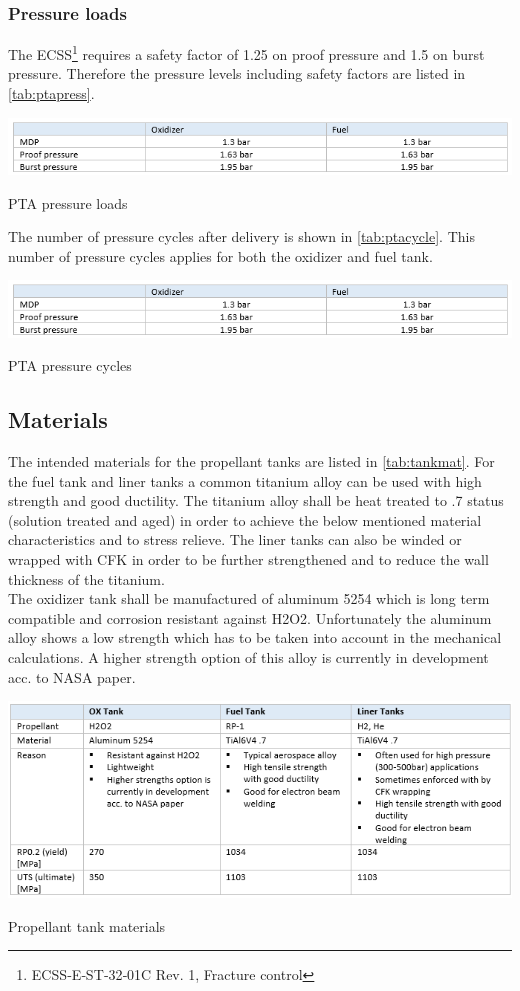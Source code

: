 \subsubsection{Pressure loads}
The ECSS\footnote{ECSS‐E‐ST‐32‐01C Rev. 1, Fracture control} requires a safety factor of 1.25 on proof pressure and 1.5 on burst pressure. Therefore the pressure levels including safety factors are listed in \autoref{tab:ptapress}.
\begin{table}[H]
	\centering
	\includegraphics[width = \linewidth]{ptapress}
	\caption{PTA pressure loads}
	\label{tab:ptapress}
\end{table}{}
The number of pressure cycles after delivery is shown in \autoref{tab:ptacycle}. This number of pressure cycles applies for both the oxidizer and fuel tank.
\begin{table}[H]
	\centering
	\includegraphics[width =\linewidth]{ptapress}
	\caption{PTA pressure cycles}
	\label{tab:ptacycle}
\end{table}{}
\pagebreak
\subsection{Materials}
The intended materials for the propellant tanks are listed in \autoref{tab:tankmat}. For the fuel tank and liner tanks a common titanium alloy can be used with high strength and good ductility. The titanium alloy shall be heat treated to .7 status (solution treated and aged) in order to achieve the below mentioned material characteristics and to stress relieve. The liner tanks can also be winded or wrapped with CFK in order to be further strengthened and to reduce the wall thickness of the titanium.\\

The oxidizer tank shall be manufactured of aluminum 5254 which is long term compatible and corrosion resistant against H2O2. Unfortunately the aluminum alloy shows a low strength which has to be taken into account in the mechanical calculations. A higher strength option of this alloy is currently in development acc. to NASA paper.
\begin{table}[H]
	\centering
	\includegraphics[width = \linewidth]{tankmat}
	\caption{Propellant tank materials}
	\label{tab:tankmat}
\end{table}{}
\pagebreak

